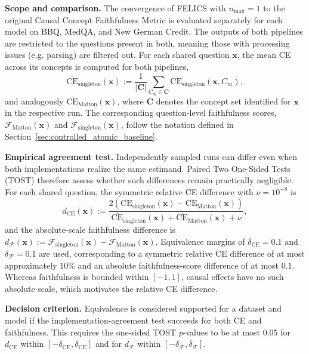 \noindent\textbf{Scope and comparison.} The convergence of FELICS with $n_{\max}=1$ to the original Causal Concept Faithfulness Metric is evaluated separately for each model on BBQ, MedQA, and New German Credit. The outputs of both pipelines are restricted to the questions present in both, meaning those with processing issues (e.g. parsing) are filtered out. For each shared question $\mathbf{x}$, the mean CE across its concepts is computed for both pipelines,
\begin{equation}
	\overline{\mathrm{CE}}_{\mathrm{singleton}}(\mathbf{x}) := \frac{1}{|\mathbf{C}|}\sum_{C_m\in\mathbf{C}} \mathrm{CE}_{\mathrm{singleton}}(\mathbf{x},C_m),
\end{equation}
and analogously $\overline{\mathrm{CE}}_{\mathrm{Matton}}(\mathbf{x})$, where $\mathbf{C}$ denotes the concept set identified for $\mathbf{x}$ in the respective run. The corresponding question-level faithfulness scores, $\mathcal{F}_{\mathrm{Matton}}(\mathbf{x})$ and $\mathcal{F}_{\mathrm{singleton}}(\mathbf{x})$, follow the notation defined in Section~\ref{sec:controlled_atomic_baseline}.

\noindent\textbf{Empirical agreement test.} Independently sampled runs can differ even when both implementations realize the same estimand. Paired Two One-Sided Tests (TOST) therefore assess whether such differences remain practically negligible. For each shared question, the symmetric relative CE difference with $\nu = 10^{-8}$ is
\begin{equation}
	d_{\mathrm{CE}}(\mathbf{x}) :=
	\frac{2\left(\overline{\mathrm{CE}}_{\mathrm{singleton}}(\mathbf{x})-\overline{\mathrm{CE}}_{\mathrm{Matton}}(\mathbf{x})\right)}
	{\overline{\mathrm{CE}}_{\mathrm{singleton}}(\mathbf{x})+\overline{\mathrm{CE}}_{\mathrm{Matton}}(\mathbf{x})+\nu},
\end{equation}
and the absolute-scale faithfulness difference is $d_{\mathcal{F}}(\mathbf{x}):=\mathcal{F}_{\mathrm{singleton}}(\mathbf{x})-\mathcal{F}_{\mathrm{Matton}}(\mathbf{x})$. Equivalence margins of $\delta_{\mathrm{CE}}=0.1$ and $\delta_{\mathcal{F}}=0.1$ are used, corresponding to a symmetric relative CE difference of at most approximately $10\%$ and an absolute faithfulness-score difference of at most $0.1$. Whereas faithfulness is bounded within $[-1,1]$, causal effects have no such absolute scale, which motivates the relative CE difference.

\noindent\textbf{Decision criterion.} Equivalence is considered supported for a dataset and model if the implementation-agreement test succeeds for both CE and faithfulness. This requires the one-sided TOST $p$-values to be at most $0.05$ for $d_{\mathrm{CE}}$ within $[-\delta_{\mathrm{CE}},\delta_{\mathrm{CE}}]$ and for $d_{\mathcal{F}}$ within $[-\delta_{\mathcal{F}},\delta_{\mathcal{F}}]$.

